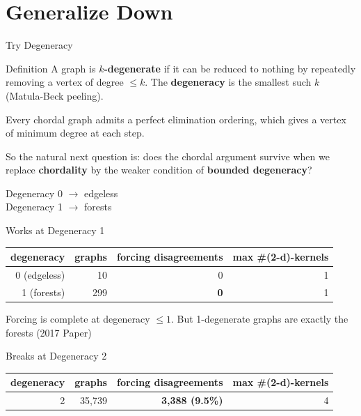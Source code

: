 \documentclass[11pt]{beamer}
\begin{document}
\section{Generalize Down}

\begin{frame}{Try Degeneracy}
  \begin{block}{Definition}
    A graph is \textbf{$k$-degenerate} if it can be reduced to nothing by
    repeatedly removing a vertex of degree $\le k$. The \textbf{degeneracy} is
    the smallest such $k$ (Matula-Beck peeling).
  \end{block}
  Every chordal graph admits a perfect elimination ordering,
  which gives a vertex of minimum degree at each step.

  So the natural next question is:
  does the chordal argument survive when we replace
  \textbf{chordality} by the weaker condition of
  \textbf{bounded degeneracy}?

  \smallskip
  Degeneracy 0 $\rightarrow$ edgeless \\
  Degeneracy 1 $\rightarrow$ forests
\end{frame}

\begin{frame}{Works at Degeneracy 1}
  \begin{center}
    \begin{tabular}{@{}rrrr@{}}
      \toprule
      degeneracy   & graphs & forcing disagreements & max \#(2-d)-kernels \\
      \midrule
      0 (edgeless) & 10     & 0                     & 1                   \\
      1 (forests)  & 299    & \textbf{0}            & 1                   \\
      \bottomrule
    \end{tabular}
  \end{center}

  Forcing is complete at degeneracy $\le 1$.
  But 1-degenerate graphs are
  exactly the forests (2017 Paper)
\end{frame}

\begin{frame}{Breaks at Degeneracy 2}
  \begin{center}
    \begin{tabular}{@{}rrrr@{}}
      \toprule
      degeneracy & graphs   & forcing disagreements    & max \#(2-d)-kernels \\
      \midrule
      2          & 35{,}739 & \textbf{3{,}388 (9.5\%)} & 4                   \\
      \bottomrule
    \end{tabular}
  \end{center}
\end{frame}
\end{document}
